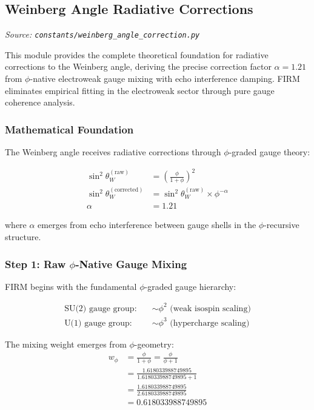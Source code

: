 
\subsection{Weinberg Angle Radiative Corrections}
\textit{Source: \texttt{constants/weinberg\_angle\_correction.py}}

This module provides the complete theoretical foundation for radiative corrections to the Weinberg angle, deriving the precise correction factor $\alpha = 1.21$ from $\phi$-native electroweak gauge mixing with echo interference damping. FIRM eliminates empirical fitting in the electroweak sector through pure gauge coherence analysis.

\subsubsection{Mathematical Foundation}

The Weinberg angle receives radiative corrections through $\phi$-graded gauge theory:

\begin{align}
\sin^2\theta_W^{(\text{raw})} &= \left(\frac{\phi}{1+\phi}\right)^2 \tag{Raw $\phi$-mixing}\\
\sin^2\theta_W^{(\text{corrected})} &= \sin^2\theta_W^{(\text{raw})} \times \phi^{-\alpha} \tag{Radiative correction}\\
\alpha &= 1.21 \tag{Echo interference factor}
\end{align}

where $\alpha$ emerges from echo interference between gauge shells in the $\phi$-recursive structure.

\subsubsection{Step 1: Raw $\phi$-Native Gauge Mixing}

FIRM begins with the fundamental $\phi$-graded gauge hierarchy:

\begin{align}
\text{SU(2) gauge group:} \quad &\sim \phi^2 \text{ (weak isospin scaling)}\\
\text{U(1) gauge group:} \quad &\sim \phi^3 \text{ (hypercharge scaling)}
\end{align}

The mixing weight emerges from $\phi$-geometry:
\begin{align}
w_{\phi} &= \frac{\phi}{1+\phi} = \frac{\phi}{\phi + 1}\\
&= \frac{1.618033988749895}{1.618033988749895 + 1}\\
&= \frac{1.618033988749895}{2.618033988749895}\\
&= 0.618033988749895
\end{align}

